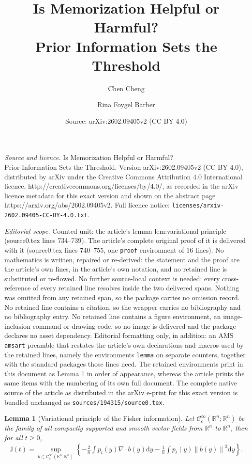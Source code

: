 \documentclass[10pt,a4paper]{amsart}
\title{Is Memorization Helpful or Harmful? \\ Prior Information Sets the Threshold}
\author{Chen Cheng \and Rina Foygel Barber\samethanks}
\date{Source: arXiv:2602.09405v2 (CC BY 4.0)}
\newtheorem{lemma}{Lemma}
\newcommand{\R}{\mathbb{R}} %
\newcommand{\de}{\mathrm{d}}
\newcommand{\jfunc}{\mathsf{J}}
\newcommand{\mc}[1]{\mathcal{#1}}
\newcommand{\norm}[1]{\left\|{#1}\right\|} %
\begin{document}
\maketitle

\noindent\emph{Source and licence.} Is Memorization Helpful or Harmful? \\ Prior Information Sets the Threshold. Version arXiv:2602.09405v2 (CC BY 4.0), distributed by arXiv under the Creative Commons Attribution 4.0 International licence, http://creativecommons.org/licenses/by/4.0/, as recorded in the arXiv licence metadata for this exact version and shown on the abstract page https://arxiv.org/abs/2602.09405v2. Full licence notice: \texttt{licenses/arxiv-2602.09405-CC-BY-4.0.txt}.\par\smallskip

\noindent\textit{Editorial scope.} Counted unit: the article's lemma lem:variational-principle (source0.tex lines 734--739). The article's complete original proof of it is delivered with it (source0.tex lines 740--755, one \texttt{proof} environment of 16 lines). No mathematics is written, repaired or re-derived: the statement and the proof are the article's own lines, in the article's own notation, and no retained line is substituted or re-flowed.  No further source-local context is needed: every cross-reference of every retained line resolves inside the two delivered spans.  Nothing was omitted from any retained span, so the package carries no omission record.  No retained line contains a citation, so the wrapper carries no bibliography and no bibliography entry.  No retained line contains a figure environment, an image-inclusion command or drawing code, so no image is delivered and the package declares no asset dependency.  Editorial formatting only, in addition: an AMS \texttt{amsart} preamble that restates the article's own declarations and macros used by the retained lines, namely the environments \texttt{lemma} on separate counters, together with the standard packages those lines need.  The retained environments print in this document as Lemma 1 in order of appearance, whereas the article prints the same items with the numbering of its own full document.  The complete native source of the article as distributed in the arXiv e-print for this exact version is bundled unchanged as \texttt{sources/194315/source0.tex}.
\begin{lemma}[Variational principle of the Fisher information] \label{lem:variational-principle} Let $\mc{C}^\infty_c(\R^n; \R^n)$ be the family of all compactly supported and smooth vector fields from $\R^n$ to $\R^n$, then for all $t \geq 0$,
\begin{align*}
    \jfunc(t) = \sup _{b \in \mc{C}_c^{\infty}(\R^n; \R^n)}\left\{- \frac{2}{n} \int p_t(y) \nabla \cdot b(y) \de y- \frac{1}{n}\int p_t(y) \norm{b(y)}^2 \de y\right\} .
\end{align*}
    
\end{lemma}
\end{document}
